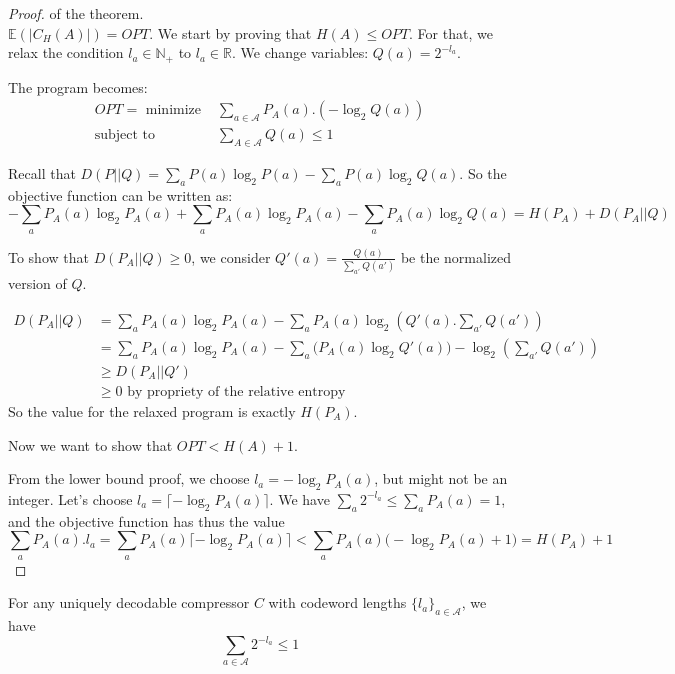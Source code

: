 \begin{proof} of the theorem.\\
$\mathbb{E}(|C_H(A)|)=OPT$. We start by proving that $H(A)\leq OPT$. For that, we relax the condition $l_a \in \mathbb{N_+}$ to $l_a \in \mathbb{R}$. We change variables: $Q(a)=2^{-l_a}$.

The program becomes:
\begin{align*}
OPT=\text{ minimize } & \sum_{a\in \mathcal{A}}P_A(a). (-\log_2 Q(a) ) \\
\text{subject to } & \sum_{A\in \mathcal{A}} Q(a)\leq 1
\end{align*}

Recall that $D(P||Q)=\sum_a P(a)\log_2 P(a) - \sum_a P(a)\log_2 Q(a)$. So the objective function can be written as:
\begin{equation*}
-\sum_a P_A(a)\log_2 P_A(a) + \sum_a P_A(a)\log_2 P_A(a) - \sum_a P_A(a)\log_2 Q(a) = H(P_A) + D(P_A||Q)
\end{equation*}

To show that $D(P_A||Q)\geq 0$, we consider $Q'(a)=\frac{Q(a)}{\sum_{a'} Q(a')}$ be the normalized version of $Q$.

\begin{align*}
D(P_A||Q) & = \sum_a P_A(a)\log_2 P_A(a) - \sum_a P_A(a)\log_2 (Q'(a).\sum_{a'} Q(a'))\\
& = \sum_a P_A(a)\log_2 P_A(a) - \sum_a \Big( P_A(a)\log_2 Q'(a) \Big) - \log_2(\sum_{a'} Q(a') )\\
& \geq D(P_A||Q')\\
& \geq 0 \text{ by propriety of the relative entropy}
\end{align*}
So the value for the relaxed program is exactly $H(P_A)$.

Now we want to show that $OPT<H(A)+1$.

From the lower bound proof, we choose $l_a=-\log_2 P_A(a)$, but might not be an integer. Let's choose $l_a=\lceil - \log_2 P_A(a) \rceil$. We have $\sum_a 2^{-l_a}\leq \sum_{a} P_A(a)=1$, and the objective function has thus the value 
\[
\sum_a P_A(a).l_a = \sum_a P_A(a) \lceil - \log_2 P_A(a) \rceil < \sum_a P_A(a)\big( -\log_2P_A(a) + 1 \big) =H(P_A)+1
\]
\end{proof}

\begin{prop}
For any uniquely decodable compressor $C$ with codeword lengths $\{l_a\}_{a\in \mathcal{A}}$, we have 
\[\sum_{a\in \mathcal{A}} 2^{-l_a}\leq 1\]
\end{prop}

